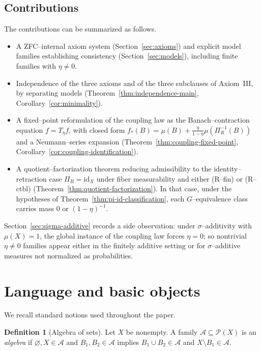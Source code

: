\documentclass[11pt]{article}
\numberwithin{equation}{section}
\theoremstyle{definition}
\newtheorem{definition}[theorem]{Definition}
\begin{document}
\subsection{Contributions}\label{sec:contributions}
The contributions can be summarized as follows.
\begin{itemize}[nosep]
  \item A ZFC--internal axiom system (Section~\ref{sec:axioms}) and explicit model families establishing consistency (Section~\ref{sec:models}), including finite families with $\eta\neq 0$.
  \item Independence of the three axioms and of the three subclauses of Axiom~III, by separating models (Theorem~\ref{thm:independence-main}, Corollary~\ref{cor:minimality}).
  \item A fixed--point reformulation of the coupling law as the Banach--contraction equation $f=T_\eta f$, with closed form $f_*(B)=\mu(B)+\tfrac{\eta}{1-\eta}\mu(\Pi_R^{-1}(B))$ and a Neumann--series expansion (Theorem~\ref{thm:coupling-fixed-point}, Corollary~\ref{cor:coupling-identification}).
  \item A quotient--factorization theorem reducing admissibility to the identity--retraction case $\Pi_R=\mathrm{id}_X$ under fiber measurability and either (R--fin) or (R--ctbl) (Theorem~\ref{thm:quotient-factorization}). In that case, under the hypotheses of Theorem~\ref{thm:pi-id-classification}, each $G$--equivalence class carries mass $0$ or $(1-\eta)^{-1}$.
\end{itemize}
Section~\ref{sec:sigma-additive} records a side observation: under $\sigma$--additivity with $\mu(X)=1$, the global instance of the coupling law forces $\eta=0$; so nontrivial $\eta\neq 0$ families appear either in the finitely additive setting or for $\sigma$--additive measures not normalized as probabilities.


\section{Language and basic objects}

We recall standard notions used throughout the paper.

\begin{definition}[Algebra of sets]
Let $X$ be nonempty. A family $\mathcal A\subseteq\mathcal P(X)$ is an \emph{algebra} if $\varnothing,X\in\mathcal A$ and
$B_1,B_2\in\mathcal A$ implies $B_1\cup B_2\in\mathcal A$ and $X\setminus B_1\in\mathcal A$.
\end{definition}
\end{document}
